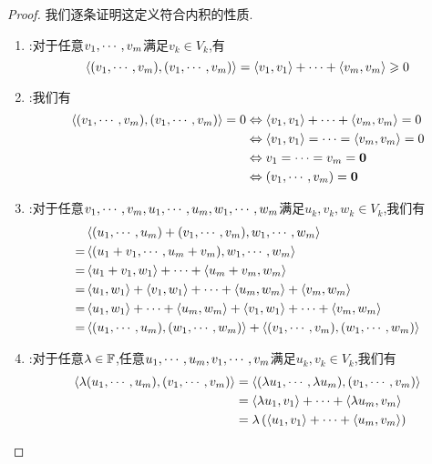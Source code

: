 \documentclass{ctexart}
\begin{document}
\begin{proof}
    我们逐条证明这定义符合内积的性质.
    \begin{enumerate}[label=\tbf{(\arabic*)}]
        \item {}:对于任意${v}_1,\cdots,{v}_{m}$满足$v_k\in V_k$,有
            \[\left\langle{({v}_1,\cdots,{v}_{m})},{({v}_1,\cdots,{v}_{m})}\right\rangle=\left\langle{v_1},{v_1}\right\rangle+\cdots+\left\langle{v_m},{v_m}\right\rangle\geqslant0\]
        \item {}:我们有
            \[\begin{aligned}
                \left\langle{({v}_1,\cdots,{v}_{m})},{({v}_1,\cdots,{v}_{m})}\right\rangle=0
                &\Leftrightarrow\left\langle{v_1},{v_1}\right\rangle+\cdots+\left\langle{v_m},{v_m}\right\rangle=0\\
                &\Leftrightarrow \left\langle{v_1},{v_1}\right\rangle=\cdots=\left\langle{v_m},{v_m}\right\rangle=0\\
                &\Leftrightarrow {v}_1=\cdots={v}_{m}=\mathbf0 \\
                &\Leftrightarrow \left({v}_1,\cdots,{v}_{m}\right)=\mathbf0
            \end{aligned}\]
        \item {}:对于任意${v}_1,\cdots,{v}_{m},{u}_1,\cdots,{u}_{m},{w}_1,\cdots,{w}_{m}$满足$u_k,v_k,w_k\in V_k$,我们有
            \[\begin{aligned}
                &\left\langle{({u}_1,\cdots,{u}_{m})+({v}_1,\cdots,{v}_{m})},{{w}_1,\cdots,{w}_{m}}\right\rangle \\
                =&\left\langle{(u_1+v_1,\cdots,u_m+v_m)},{{w}_1,\cdots,{w}_{m}}\right\rangle \\
                =&\left\langle{u_1+v_1},{w_1}\right\rangle+\cdots+\left\langle{u_m+v_m},{w_m}\right\rangle \\
                =&\left\langle{u_1},{w_1}\right\rangle+\left\langle{v_1},{w_1}\right\rangle+\cdots+\left\langle{u_m},{w_m}\right\rangle+\left\langle{v_m},{w_m}\right\rangle \\
                =&\left\langle{u_1},{w_1}\right\rangle+\cdots+\left\langle{u_m},{w_m}\right\rangle+\left\langle{v_1},{w_1}\right\rangle+\cdots+\left\langle{v_m},{w_m}\right\rangle \\
                =&\left\langle{({u}_1,\cdots,{u}_{m})},{({w}_1,\cdots,{w}_{m})}\right\rangle+\left\langle{({v}_1,\cdots,{v}_{m})},{({w}_1,\cdots,{w}_{m})}\right\rangle
            \end{aligned}\]
        \item {}:对于任意$\lambda\in\mathbb{F}$,任意${u}_1,\cdots,{u}_{m},{v}_1,\cdots,{v}_{m}$满足$u_k,v_k\in V_k$,我们有
            \[\begin{aligned}
                \inprod{\lambda(\li u,m)}{(\li v,m)}
                &= \inprod{(\li{\lambda u},m)}{(\li v,m)} \\
                &= \inprod{\lambda u_1}{v_1}+\cdots+\inprod{\lambda u_m}{v_m} \\
                &= \lambda\left(\inprod {u_1}{v_1}+\cdots+\inprod{u_m}{v_m}\right) \\

\end{aligned}\]
\end{enumerate}
\end{proof}
\end{document}
